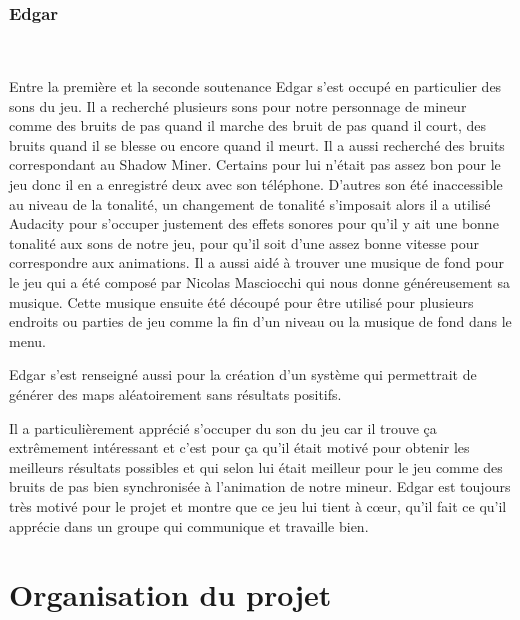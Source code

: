 \documentclass[titlepage, 13px, a4paper]{report}
\begin{document}
\newpage





\section{Edgar}
\paragraph{} \hspace{0pt} \\
Entre la première et la seconde soutenance Edgar s’est occupé en particulier des sons du jeu. 
Il a recherché plusieurs sons pour notre personnage de mineur comme des bruits de pas quand il marche des bruit de pas quand il court, 
des bruits quand il se blesse ou encore quand il meurt. Il a aussi recherché des bruits correspondant au Shadow Miner. 
Certains pour lui n’était pas assez bon pour le jeu donc il en a enregistré deux avec son téléphone. 
D’autres son été inaccessible au niveau de la tonalité, un changement de tonalité s'imposait alors il a utilisé Audacity pour 
s’occuper justement des effets sonores pour qu’il y ait une bonne tonalité aux sons de notre jeu, pour qu’il soit d’une assez bonne 
vitesse pour correspondre aux animations. Il a aussi aidé à trouver une musique de fond pour le jeu qui a été composé par Nicolas 
Masciocchi qui nous donne généreusement sa musique. Cette musique ensuite été découpé pour être utilisé pour plusieurs endroits ou 
parties de jeu comme la fin d’un niveau ou la musique de fond dans le menu. 

Edgar s’est renseigné aussi pour la création d’un système qui permettrait de générer des maps aléatoirement sans résultats positifs. 

Il a particulièrement apprécié s'occuper du son du jeu car il trouve ça extrêmement intéressant et c’est pour ça qu’il était motivé 
pour obtenir les meilleurs résultats possibles et qui selon lui était meilleur pour le jeu comme des bruits de pas bien synchronisée 
à l’animation de notre mineur. Edgar est toujours très motivé pour le projet et montre que ce jeu lui tient à cœur, qu'il fait 
ce qu’il apprécie dans un groupe qui communique et travaille bien.







\newpage
{}
\part{Organisation du projet}
\end{document}
